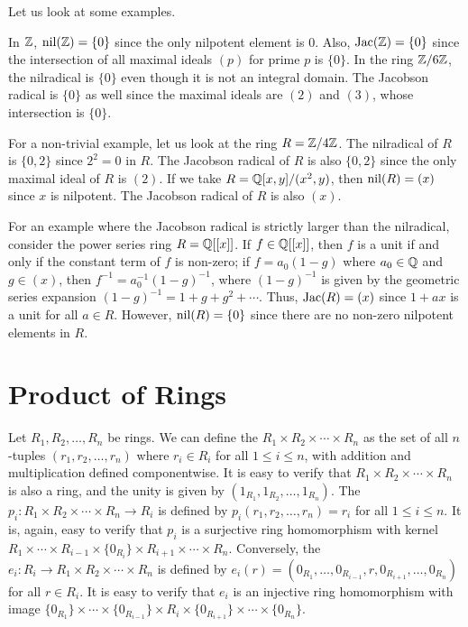 Let us look at some examples.

\begin{example}
    In $\mathbb{Z}$, $\operatorname{nil}(\mathbb{Z}) = \{0\}$ since the only nilpotent element is $0$. Also, $\operatorname{Jac}(\mathbb{Z}) = \{0\}$ since the intersection of all maximal ideals $(p)$ for prime $p$ is $\{0\}$. In the ring $\mathbb{Z}/6\mathbb{Z}$, the nilradical is $\{0\}$ even though it is not an integral domain. The Jacobson radical is $\{0\}$ as well since the maximal ideals are $(2)$ and $(3)$, whose intersection is $\{0\}$.
\end{example}

\begin{example}
    For a non-trivial example, let us look at the ring $R = \mathbb{Z}/4\mathbb{Z}$. The nilradical of $R$ is $\{0, 2\}$ since $2^{2} = 0$ in $R$. The Jacobson radical of $R$ is also $\{0, 2\}$ since the only maximal ideal of $R$ is $(2)$. If we take $R = \mathbb{Q}[x,y]/(x^{2},y)$, then $\operatorname{nil}(R) = (x)$ since $x$ is nilpotent. The Jacobson radical of $R$ is also $(x)$.
\end{example}


\begin{example}
    For an example where the Jacobson radical is strictly larger than the nilradical, consider the power series ring $R = \mathbb{Q}[[x]]$. If $f \in \mathbb{Q}[[x]]$, then $f$ is a unit if and only if the constant term of $f$ is non-zero; if $f = a_{0}(1-g)$ where $a_{0} \in \mathbb{Q}$ and $g \in (x)$, then $f^{-1} = a_{0}^{-1}(1-g)^{-1}$, where $(1-g)^{-1}$ is given by the geometric series expansion $(1-g)^{-1} = 1 + g + g^{2} + \cdots$. Thus, $\operatorname{Jac}(R) = (x)$ since $1 + ax$ is a unit for all $a \in R$. However, $\operatorname{nil}(R) = \{0\}$ since there are no non-zero nilpotent elements in $R$.
\end{example}


\section{Product of Rings}

Let $R_{1},R_{2},\ldots,R_{n}$ be rings. We can define the  $R_{1} \times R_{2} \times \cdots \times R_{n}$ as the set of all $n$-tuples $(r_{1}, r_{2}, \ldots, r_{n})$ where $r_{i} \in R_{i}$ for all $1 \leq i \leq n$, with addition and multiplication defined componentwise. It is easy to verify that $R_{1} \times R_{2} \times \cdots \times R_{n}$ is also a ring, and the unity is given by $(1_{R_{1}}, 1_{R_{2}}, \ldots, 1_{R_{n}})$. The  $p_{i} : R_{1} \times R_{2} \times \cdots \times R_{n} \to R_{i}$ is defined by $p_{i}(r_{1}, r_{2}, \ldots, r_{n}) = r_{i}$ for all $1 \leq i \leq n$. It is, again, easy to verify that $p_{i}$ is a surjective ring homomorphism with kernel $R_{1} \times \cdots \times R_{i-1} \times \{0_{R_{i}}\} \times R_{i+1} \times \cdots \times R_{n}$. Conversely, the  $e_{i} : R_{i} \to R_{1} \times R_{2} \times \cdots \times R_{n}$ is defined by $e_{i}(r) = (0_{R_{1}}, \ldots, 0_{R_{i-1}}, r, 0_{R_{i+1}}, \ldots, 0_{R_{n}})$ for all $r \in R_{i}$. It is easy to verify that $e_{i}$ is an injective ring homomorphism with image $\{0_{R_{1}}\} \times \cdots \times \{0_{R_{i-1}}\} \times R_{i} \times \{0_{R_{i+1}}\} \times \cdots \times \{0_{R_{n}}\}$.

